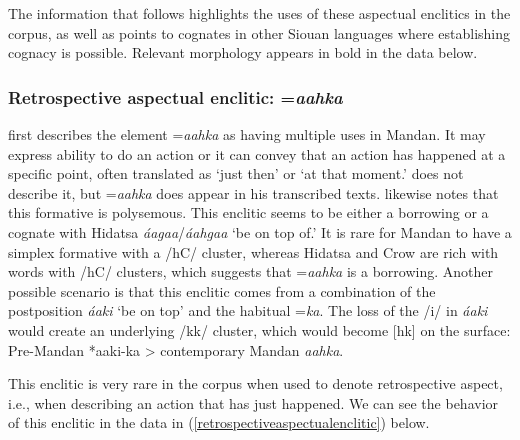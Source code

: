 The information that follows highlights the uses of these aspectual enclitics in the corpus, as well as points to cognates in other Siouan languages where establishing cognacy is possible. Relevant morphology appears in bold in the data below.

\subsubsection{Retrospective aspectual enclitic: =\textit{aahka}}\label{Sec:Retrospective}

\citet[23]{kennard1936} first describes the element =\textit{aahka} as having multiple uses in Mandan. It may express ability to do an action or it can convey that an action has happened at a specific point, often translated as `just then' or `at that moment.' \citet{hollow1970} does not describe it, but =\textit{aahka} does appear in his transcribed texts. \citet[54]{mixco1997a} likewise notes that this formative is polysemous. This enclitic seems to be either a borrowing or a cognate with Hidatsa \textit{áagaa}/\textit{áahgaa} `be on top of.' It is rare for Mandan to have a simplex formative with a /hC/ cluster, whereas Hidatsa and Crow are rich with words with /hC/ clusters, which suggests that =\textit{aahka} is a borrowing. Another possible scenario is that this enclitic comes from a combination of the postposition \textit{áaki} `be on top' and the habitual =\textit{ka}. The loss of the /i/ in \textit{áaki} would create an underlying /kk/ cluster, which would become [hk] on the surface: Pre-Mandan *aaki-ka > contemporary Mandan \textit{aahka}.

This enclitic is very rare in the corpus when used to denote retrospective aspect, i.e., when describing an action that has just happened. We can see the behavior of this enclitic in the data in (\ref{retrospectiveaspectualenclitic}) below.

